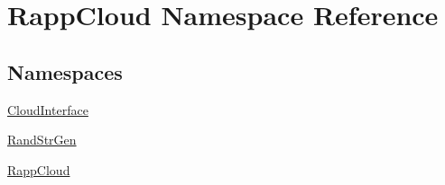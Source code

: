 \hypertarget{namespaceRappCloud}{\section{Rapp\-Cloud Namespace Reference}
\label{namespaceRappCloud}
}
\subsection*{Namespaces}
\begin{DoxyCompactItemize}
\item 
\hyperlink{namespaceRappCloud_1_1CloudInterface}{Cloud\-Interface}
\item 
\hyperlink{namespaceRappCloud_1_1RandStrGen}{Rand\-Str\-Gen}
\item 
\hyperlink{namespaceRappCloud_1_1RappCloud}{Rapp\-Cloud}
\end{DoxyCompactItemize}
